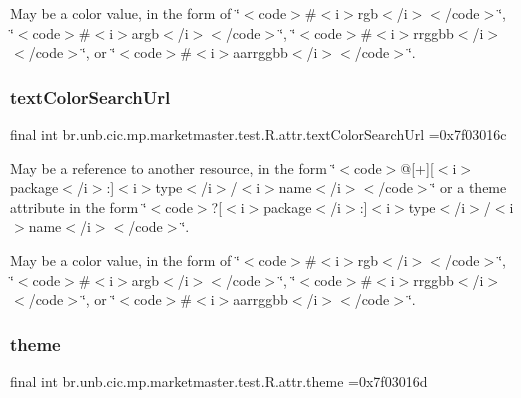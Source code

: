 May be a color value, in the form of \char`\"{}$<$code$>$\#$<$i$>$rgb$<$/i$>$$<$/code$>$\char`\"{}, \char`\"{}$<$code$>$\#$<$i$>$argb$<$/i$>$$<$/code$>$\char`\"{}, \char`\"{}$<$code$>$\#$<$i$>$rrggbb$<$/i$>$$<$/code$>$\char`\"{}, or \char`\"{}$<$code$>$\#$<$i$>$aarrggbb$<$/i$>$$<$/code$>$\char`\"{}. \mbox{\label{classbr_1_1unb_1_1cic_1_1mp_1_1marketmaster_1_1test_1_1R_1_1attr_a38273d9795dc8d00b869eac198d9a185}} 
\subsubsection{\texorpdfstring{text\+Color\+Search\+Url}{textColorSearchUrl}}
{\footnotesize\ttfamily final int br.\+unb.\+cic.\+mp.\+marketmaster.\+test.\+R.\+attr.\+text\+Color\+Search\+Url =0x7f03016c\hspace{0.3cm}{\ttfamily [static]}}

May be a reference to another resource, in the form \char`\"{}$<$code$>$@\mbox{[}+\mbox{]}\mbox{[}$<$i$>$package$<$/i$>$\+:\mbox{]}$<$i$>$type$<$/i$>$/$<$i$>$name$<$/i$>$$<$/code$>$\char`\"{} or a theme attribute in the form \char`\"{}$<$code$>$?\mbox{[}$<$i$>$package$<$/i$>$\+:\mbox{]}$<$i$>$type$<$/i$>$/$<$i$>$name$<$/i$>$$<$/code$>$\char`\"{}. 

May be a color value, in the form of \char`\"{}$<$code$>$\#$<$i$>$rgb$<$/i$>$$<$/code$>$\char`\"{}, \char`\"{}$<$code$>$\#$<$i$>$argb$<$/i$>$$<$/code$>$\char`\"{}, \char`\"{}$<$code$>$\#$<$i$>$rrggbb$<$/i$>$$<$/code$>$\char`\"{}, or \char`\"{}$<$code$>$\#$<$i$>$aarrggbb$<$/i$>$$<$/code$>$\char`\"{}. \mbox{\label{classbr_1_1unb_1_1cic_1_1mp_1_1marketmaster_1_1test_1_1R_1_1attr_a1bafce659a5472bb29bc469ea313730a}} 
\subsubsection{\texorpdfstring{theme}{theme}}
{\footnotesize\ttfamily final int br.\+unb.\+cic.\+mp.\+marketmaster.\+test.\+R.\+attr.\+theme =0x7f03016d\hspace{0.3cm}{\ttfamily [static]}}

